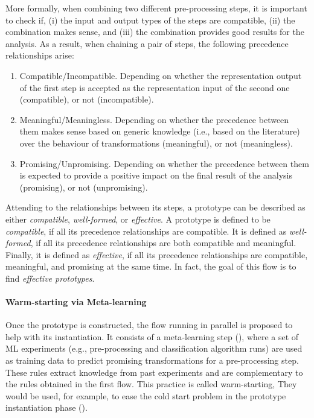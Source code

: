 More formally, when combining two different pre-processing steps, it is important to check if, (i) the input and output types of the steps are compatible, (ii) the combination makes sense, and (iii) the combination provides good results for the analysis.
As a result, when chaining a pair of steps, the following precedence relationships arise:
\begin{enumerate}
    \item Compatible/Incompatible. Depending on whether the representation output of the first step is accepted as the representation input of the second one (compatible), or not (incompatible).
    \item Meaningful/Meaningless. Depending on whether the precedence between them makes sense based on generic knowledge (i.e., based on the literature) over the behaviour of transformations (meaningful), or not (meaningless).
    \item Promising/Unpromising. Depending on whether the precedence between them is expected to provide a positive impact on the final result of the analysis (promising), or not (unpromising).
\end{enumerate}

Attending to the relationships between its steps, a prototype can be described as either \textit{compatible}, \textit{well-formed}, or \textit{effective}.
A prototype is defined to be \textit{compatible}, if all its precedence relationships are compatible.
It is defined as \textit{well-formed}, if all its precedence relationships are both compatible and meaningful.
Finally, it is defined as \textit{effective}, if all its precedence relationships are compatible, meaningful, and promising at the same time.
In fact, the goal of this flow is to find \textit{effective prototypes}.

\paragraph{Warm-starting via Meta-learning} Once the prototype is constructed, the flow running in parallel is proposed to help with its instantiation.
It consists of a meta-learning step  (), where a set of ML experiments (e.g., pre-processing and classification algorithm runs) are used as training data to predict promising transformations for a pre-processing step.
These rules extract knowledge from past experiments and are complementary to the rules obtained in the first flow.
This practice is called warm-starting,
They would be used, for example, to ease the cold start problem in the prototype instantiation phase  ().
\\


